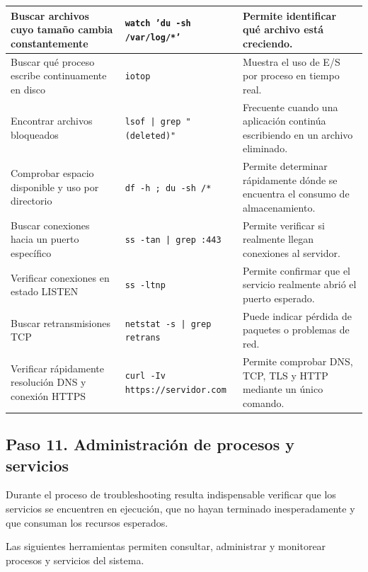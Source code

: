 \documentclass[a4paper,10pt]{article}
\begin{document}
\begin{longtable}{|p{4.8cm}|p{7.5cm}|p{4cm}|}
Buscar archivos cuyo tamaño cambia constantemente &
\texttt{watch 'du -sh /var/log/*'} &
Permite identificar qué archivo está creciendo.
\\
\hline

Buscar qué proceso escribe continuamente en disco &
\texttt{iotop} &
Muestra el uso de E/S por proceso en tiempo real.
\\
\hline

Encontrar archivos bloqueados &
\texttt{lsof | grep "(deleted)"} &
Frecuente cuando una aplicación continúa escribiendo en un archivo eliminado.
\\
\hline

Comprobar espacio disponible y uso por directorio &
\texttt{df -h ; du -sh /*} &
Permite determinar rápidamente dónde se encuentra el consumo de almacenamiento.
\\
\hline

Buscar conexiones hacia un puerto específico &
\texttt{ss -tan | grep :443} &
Permite verificar si realmente llegan conexiones al servidor.
\\
\hline

Verificar conexiones en estado LISTEN &
\texttt{ss -ltnp} &
Permite confirmar que el servicio realmente abrió el puerto esperado.
\\
\hline

Buscar retransmisiones TCP &
\texttt{netstat -s | grep retrans} &
Puede indicar pérdida de paquetes o problemas de red.
\\
\hline

Verificar rápidamente resolución DNS y conexión HTTPS &
\texttt{curl -Iv https://servidor.com} &
Permite comprobar DNS, TCP, TLS y HTTP mediante un único comando.
\\
\hline

\end{longtable}


\subsection{Paso 11. Administración de procesos y servicios}

Durante el proceso de troubleshooting resulta indispensable verificar que los
servicios se encuentren en ejecución, que no hayan terminado inesperadamente y
que consuman los recursos esperados.

Las siguientes herramientas permiten consultar, administrar y monitorear
procesos y servicios del sistema.
\end{document}
